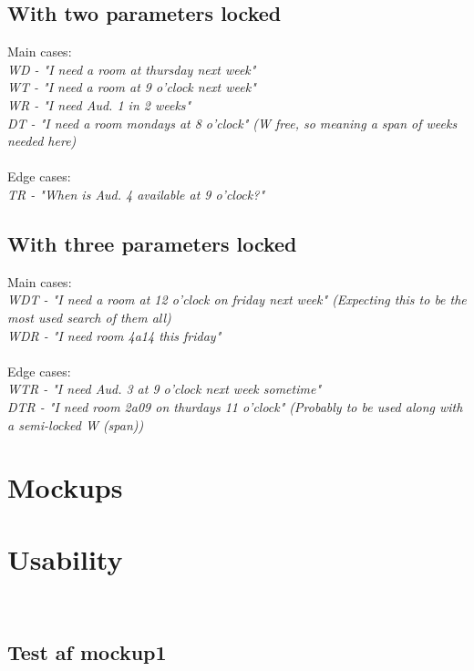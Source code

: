 \subsection*{With two parameters locked}
Main cases: \\ \emph{
WD - "I need a room at thursday next week" \\
WT - "I need a room at 9 o'clock next week" \\
WR - "I need Aud. 1 in 2 weeks" \\
DT - "I need a room mondays at 8 o'clock" (W free, so meaning a span of weeks needed here) \\
}\\
\noindent Edge cases: \\ \emph{
TR - "When is Aud. 4 available at 9 o'clock?" \\
}
\subsection*{With three parameters locked}
Main cases: \\ \emph{
WDT - "I need a room at 12 o'clock on friday next week" (Expecting this to be the most used search of them all) \\
WDR - "I need room 4a14 this friday" \\
}\\
\noindent Edge cases: \\ \emph{
WTR - "I need Aud. 3 at 9 o'clock next week sometime" \\
DTR - "I need room 2a09 on thurdays 11 o'clock" (Probably to be used along with a semi-locked W (span)) \\
}

\section{Mockups}

\section{Usability}
\\
\subsection{Test af mockup1}

